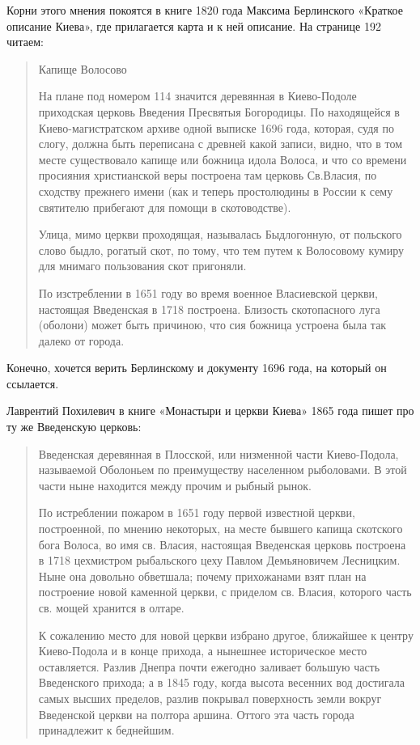 \documentclass[a5paper,11pt,openany]{article}
\begin{document}
Корни этого мнения покоятся в книге 1820 года Максима Берлинского «Краткое описание Киева», где прилагается карта и к ней описание. На странице 192 читаем:

\begin{quotation}
\noindent Капище Волосово

На плане под номером 114 значится деревянная в Киево-Подоле приходская церковь Введения Пресвятыя Богородицы. По находящейся в Киево-магистратском архиве одной выписке 1696 года, которая, судя по слогу, должна быть переписана с древней какой записи, видно, что в том месте существовало капище или божница идола Волоса, и что со времени просияния христианской веры построена там церковь Св.Власия, по сходству прежнего имени (как и теперь простолюдины в России к сему святителю прибегают для помощи в скотоводстве).

  Улица, мимо церкви проходящая, называлась Быдлогонную, от польского слово быдло, рогатый скот, по тому, что тем путем к Волосовому кумиру для мнимаго пользования скот пригоняли.

   По изстреблении в 1651 году во время военное Власиевской церкви, настоящая Введенская в 1718 построена. Близость скотопасного луга (оболони) может быть причиною, что сия божница устроена была так далеко от города.
\end{quotation}

   Конечно, хочется верить Берлинскому и документу 1696 года, на который он ссылается.  

Лаврентий Похилевич в книге «Монастыри и церкви Киева» 1865 года пишет про ту же Введенскую церковь:

\begin{quotation}
\noindent Введенская деревянная в Плосской, или низменной части Киево-Подола, называемой Оболоньем по преимуществу населенном рыболовами. В этой части ныне находится между прочим и рыбный рынок.

По истреблении пожаром в 1651 году первой известной церкви, построенной, по мнению некоторых, на месте бывшего капища скотского бога Волоса, во имя св. Власия, настоящая Введенская церковь построена в 1718 цехмистром рыбальского цеху Павлом Демьяновичем Лесницким. Ныне она довольно обветшала; почему прихожанами взят план на построение новой каменной церкви, с приделом св. Власия, которого часть св. мощей хранится в олтаре.

К сожалению место для новой церкви избрано другое, ближайшее к центру Киево-Подола и в конце прихода, а нынешнее историческое место оставляется. Разлив Днепра почти ежегодно заливает большую часть Введенского прихода; а в 1845 году, когда высота весенних вод достигала самых высших пределов, разлив покрывал поверхность земли вокруг Введенской церкви на полтора аршина. Оттого эта часть города принадлежит к беднейшим.\end{quotation}
\end{document}

